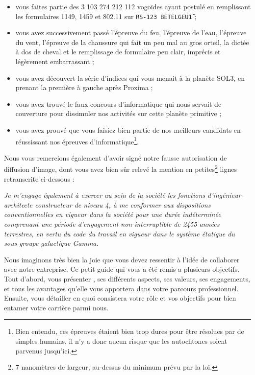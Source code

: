 \begin{itemize}
    \item vous faites partie des 3 103 274 212 112 vogoïdes ayant postulé en
        remplissant les formulaires 1149, 1459 et 802.11 sur \texttt{RS-123
        BETELGEU\~1} ;
    \item vous avez successivement passé l'épreuve du feu, l'épreuve de l'eau,
        l'épreuve du vent, l'épreuve de la chaussure qui fait un peu mal au
        gros orteil, la dictée à dos de cheval et le remplissage de formulaire
        peu clair, imprécis et légèrement embarrassant ;
    \item vous avez découvert la série d'indices qui vous menait à la planète
        SOL3, en prenant la première à gauche après Proxima ;
    \item vous avez trouvé le faux concours d'informatique qui nous servait de
        couverture pour dissimuler nos activités sur cette planète primitive ;
    \item vous avez prouvé que vous faisiez bien partie de nos meilleurs
        candidats en réussissant nos épreuves d'informatique\footnote{Bien
        entendu, ces épreuves étaient bien trop dures pour être résolues par de
        simples humains, il n'y a donc aucun risque que les autochtones soient
        parvenus jusqu'ici.}.
\end{itemize}

Nous vous remercions également d'avoir signé notre fausse autorisation de
diffusion d'image, dont vous avez bien sûr relevé la mention en
petites\footnote{7 nanomètres de largeur, au-dessus du minimum prévu par la
loi.} lignes retranscrite ci-dessous :

\emph{Je m'engage également à exercer au sein de la société \provogon{} les
fonctions d'ingénieur-architecte constructeur de niveau 4, à me conformer aux
dispositions conventionnelles en vigueur dans la société \provogon{} pour une
durée indéterminée comprenant une période d'engagement non-interruptible de
2455 années terrestres, en vertu du code du travail en vigueur dans le système
étatique du sous-groupe galactique Gamma.}

Nous imaginons très bien la joie que vous devez ressentir à l'idée de
collaborer avec notre entreprise. Ce petit guide qui vous a été remis a
plusieurs objectifs. Tout d'abord, vous présenter \provogon{}, ses différents
aspects, ses valeurs, ses engagements, et tous les avantages qu'elle vous
apportera dans votre parcours professionnel. Ensuite, vous détailler en quoi
consistera votre rôle et vos objectifs pour bien entamer votre carrière parmi
nous.

